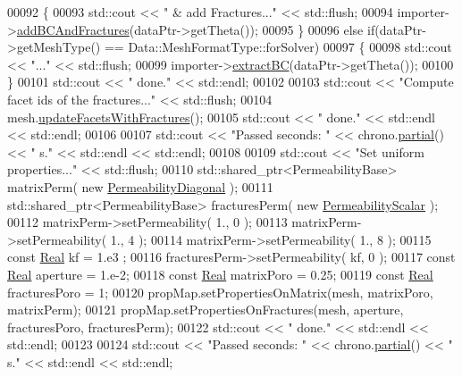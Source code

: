 \begin{DoxyCode}
00092     \{
00093         std::cout << \textcolor{stringliteral}{" & add Fractures..."} << std::flush;
00094         importer->\hyperlink{classFVCode3D_1_1Importer_ac21d82671c21b2e4069511ef0585d7f6}{addBCAndFractures}(dataPtr->getTheta());
00095     \}
00096     \textcolor{keywordflow}{else} \textcolor{keywordflow}{if}(dataPtr->getMeshType() == Data::MeshFormatType::forSolver)
00097     \{
00098         std::cout << \textcolor{stringliteral}{"..."} << std::flush;
00099         importer->\hyperlink{classFVCode3D_1_1Importer_a1cba26ff3b2c475a51866361883c59fc}{extractBC}(dataPtr->getTheta());
00100     \}
00101     std::cout << \textcolor{stringliteral}{" done."} << std::endl;
00102 
00103     std::cout << \textcolor{stringliteral}{"Compute facet ids of the fractures..."} << std::flush;
00104     mesh.\hyperlink{classFVCode3D_1_1Mesh3D_a164529f402302f3f74235ad91c8bea07}{updateFacetsWithFractures}();
00105     std::cout << \textcolor{stringliteral}{" done."} << std::endl << std::endl;
00106 
00107     std::cout << \textcolor{stringliteral}{"Passed seconds: "} << chrono.\hyperlink{classFVCode3D_1_1Chrono_a245a0c47da85e80de56e85d3689b925b}{partial}() << \textcolor{stringliteral}{" s."} << std::endl << std::endl;
00108 
00109     std::cout << \textcolor{stringliteral}{"Set uniform properties..."} << std::flush;
00110     std::shared\_ptr<PermeabilityBase> matrixPerm( \textcolor{keyword}{new} \hyperlink{classFVCode3D_1_1PermeabilityDiagonal}{PermeabilityDiagonal} );
00111     std::shared\_ptr<PermeabilityBase> fracturesPerm( \textcolor{keyword}{new} \hyperlink{classFVCode3D_1_1PermeabilityScalar}{PermeabilityScalar} );
00112     matrixPerm->setPermeability( 1., 0 );
00113     matrixPerm->setPermeability( 1., 4 );
00114     matrixPerm->setPermeability( 1., 8 );
00115     \textcolor{keyword}{const} \hyperlink{namespaceFVCode3D_a40c1f5588a248569d80aa5f867080e83}{Real} kf = 1.e3 ; 
00116     fracturesPerm->setPermeability( kf, 0 );
00117     \textcolor{keyword}{const} \hyperlink{namespaceFVCode3D_a40c1f5588a248569d80aa5f867080e83}{Real} aperture = 1.e-2;
00118     \textcolor{keyword}{const} \hyperlink{namespaceFVCode3D_a40c1f5588a248569d80aa5f867080e83}{Real} matrixPoro = 0.25;
00119     \textcolor{keyword}{const} \hyperlink{namespaceFVCode3D_a40c1f5588a248569d80aa5f867080e83}{Real} fracturesPoro = 1; 
00120     propMap.setPropertiesOnMatrix(mesh, matrixPoro, matrixPerm);
00121     propMap.setPropertiesOnFractures(mesh, aperture, fracturesPoro, fracturesPerm);
00122     std::cout << \textcolor{stringliteral}{" done."} << std::endl << std::endl;
00123 
00124     std::cout << \textcolor{stringliteral}{"Passed seconds: "} << chrono.\hyperlink{classFVCode3D_1_1Chrono_a245a0c47da85e80de56e85d3689b925b}{partial}() << \textcolor{stringliteral}{" s."} << std::endl << std::endl;

\end{DoxyCode}
